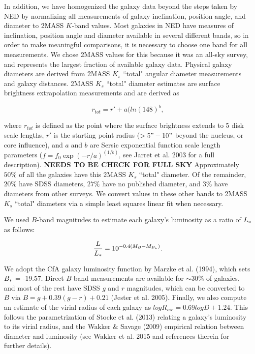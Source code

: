 \documentclass[iop]{emulateapj-rtx4}
\begin{document}
In addition, we have homogenized the galaxy data beyond the steps taken by NED by normalizing all measurements of galaxy inclination, position angle, and diameter to 2MASS $K$-band values. Most galaxies in NED have measures of inclination, position angle and diameter available in several different bands, so in order to make meaningful comparisons, it is necessary to choose one band for all measurements. We chose 2MASS values for this because it was an all-sky survey, and represents the largest fraction of available galaxy data. Physical galaxy diameters are derived from 2MASS $K_s$ ``total" angular diameter measurements and galaxy distances. 2MASS $K_s$ ``total" diameter estimates are surface brightness extrapolation measurements and are derived as 

\begin{equation}
r_{tot} = r' + a(ln(148)^b,
\end{equation}

\noindent where $r_{tot}$ is defined as the point where the surface brightness extends to 5 disk scale lengths, $r'$ is the starting point radius ($>5" - 10"$ beyond the nucleus, or core influence), and $a$ and $b$ are Sersic exponential function scale length parameters ($f = f_0 \exp{(-r/a)}^{(1/b)}$, see Jarret et al. 2003 for a full description). \textbf{NEEDS TO BE CHECK FOR FULL SKY} Approximately $50\%$ of all the galaxies have this 2MASS $K_s$ ``total" diameter. Of the remainder, $20\%$ have SDSS diameters, $27\%$ have no published diameter, and $3\%$ have diameters from other surveys. We convert values in these other bands to 2MASS $K_s$ ``total" diameters via a simple least squares linear fit when necessary.

We used $B$-band magnitudes to estimate each galaxy's luminosity as a ratio of $L_{\**}$ as follows:

\begin{equation}
	\frac{L}{L_{\**}} = 10^{-0.4 (M_{B} - M_{B_{\**}})}. 
\end{equation}

We adopt the CfA galaxy luminosity function by Marzke et al. (1994), which sets $B_{\**} $ = -19.57. Direct $B$ band measurements are available for $\sim 30\%$ of galaxies, and most of the rest have SDSS $g$ and $r$ magnitudes, which can be converted to $B$ via $B = g + 0.39 (g-r) + 0.21$ (Jester et al. 2005). Finally, we also compute an estimate of the virial radius of each galaxy as $log R_{vir} = 0.69 log D + 1.24$. This follows the parametrization of Stocke et al. (2013) relating a galaxy's luminosity to its virial radius, and the Wakker $\&$ Savage (2009) empirical relation between diameter and luminosity (see Wakker et al. 2015 and references therein for further details).
\end{document}

